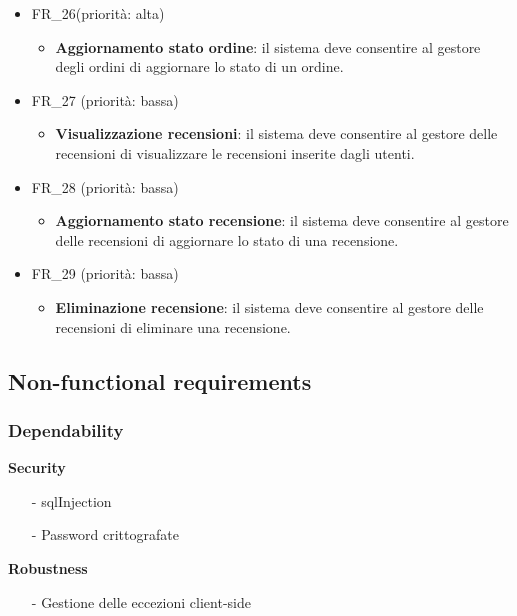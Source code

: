 \documentclass[12pt, a4paper, oneside]{book}
\begin{document}
\begin{itemize}
\begin{itemize}
                \end{itemize}
            \item FR\_26(priorità: alta)
               \begin{itemize}
                   \item \textbf{Aggiornamento stato ordine}: il sistema deve consentire al gestore degli ordini di aggiornare lo stato di un ordine.
                \end{itemize}
            \item FR\_27 (priorità: bassa)
               \begin{itemize}
                   \item \textbf{Visualizzazione recensioni}: il sistema deve consentire al gestore delle recensioni di visualizzare le recensioni inserite dagli utenti.
                \end{itemize}
            \item FR\_28 (priorità: bassa)
               \begin{itemize}
                   \item \textbf{Aggiornamento stato recensione}: il sistema deve consentire al gestore delle recensioni di aggiornare lo stato di una recensione.
                \end{itemize}
            \item FR\_29 (priorità: bassa)
               \begin{itemize}
                   \item \textbf{Eliminazione recensione}: il sistema deve consentire al gestore delle recensioni di eliminare una recensione.
                \end{itemize}
        \end{itemize} %


    \subsection*{Non-functional requirements }
        \subsubsection*{Dependability}
            \textbf{Security}
                \begin{itemize}
                    \item [-] sqlInjection
                    \item [-] Password crittografate
                \end{itemize}
            \textbf{Robustness}
                \begin{itemize}
                    \item [-] Gestione delle eccezioni client-side
                \end{itemize}
\end{document}
